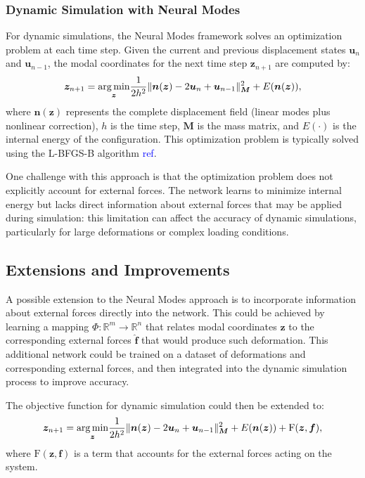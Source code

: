 \subsubsection{Dynamic Simulation with Neural Modes}
For dynamic simulations, the Neural Modes framework solves an optimization problem at each time step. Given the current and previous displacement states $\bm{u}_n$ and $\bm{u}_{n-1}$, the modal coordinates for the next time step $\bm{z}_{n+1}$ are computed by:
\begin{equation}
    \bm{z}_{n+1} = \underset{\bm{z}}{\operatorname*{arg\,min}} \frac{1}{2h^2} \|\bm{n}(\bm{z}) - 2\bm{u}_n + \bm{u}_{n-1}\|_{\bm{M}}^2 + E(\bm{n}(\bm{z})),
\end{equation}
where $\bm{n}(\bm{z})$ represents the complete displacement field (linear modes plus nonlinear correction), $h$ is the time step, $\bm{M}$ is the mass matrix, and $E(\cdot)$ is the internal energy of the configuration. This optimization problem is typically solved using the L-BFGS-B algorithm \textcolor{blue}{ref}.

One challenge with this approach is that the optimization problem does not explicitly account for external forces. The network learns to minimize internal energy but lacks direct information about external forces that may be applied during simulation: this limitation can affect the accuracy of dynamic simulations, particularly for large deformations or complex loading conditions.

\subsection{Extensions and Improvements}
A possible extension to the Neural Modes approach is to incorporate information about external forces directly into the network. This could be achieved by learning a mapping $\Phi: \mathbb{R}^m \rightarrow \mathbb{R}^n$ that relates modal coordinates $\bm{z}$ to the corresponding external forces $\hat{\bm{f}}$ that would produce such deformation. This additional network could be trained on a dataset of deformations and corresponding external forces, and then integrated into the dynamic simulation process to improve accuracy.

The objective function for dynamic simulation could then be extended to:
\begin{equation}
    \bm{z}_{n+1} = \underset{\bm{z}}{\operatorname*{arg\,min}} \frac{1}{2h^2} \|\bm{n}(\bm{z}) - 2\bm{u}_n + \bm{u}_{n-1}\|_{\bm{M}}^2 + E(\bm{n}(\bm{z})) + \text{F}(\bm{z}, \bm{f}),
\end{equation}
where $\text{F}(\bm{z}, \bm{f})$ is a term that accounts for the external forces acting on the system.

